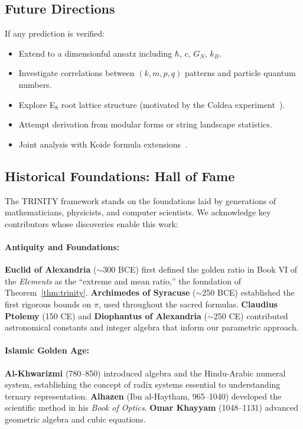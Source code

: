 \documentclass[aps,prd,preprint,superscriptaddress,showpacs,nofootinbib,longbibliography]{revtex4-2}
\begin{document}
\subsection{Future Directions}

If any prediction is verified:
\begin{itemize}[itemsep=2pt]
    \item Extend to a dimensionful ansatz including $\hbar$, $c$, $G_N$, $k_B$.
    \item Investigate correlations between $(k,m,p,q)$ patterns and particle quantum numbers.
    \item Explore E$_8$ root lattice structure (motivated by the Coldea experiment~\cite{coldea2010}).
    \item Attempt derivation from modular forms or string landscape statistics.
    \item Joint analysis with Koide formula extensions~\cite{ma2024,koide_topology2025}.
\end{itemize}

\subsection{Historical Foundations: Hall of Fame}
\label{sec:hall_of_fame}

The TRINITY framework stands on the foundations laid by generations of mathematicians, physicists, and computer scientists. We acknowledge key contributors whose discoveries enable this work:

\paragraph{Antiquity and Foundations:}
\textbf{Euclid of Alexandria} ($\sim$300 BCE) first defined the golden ratio in Book VI of the \textit{Elements} as the ``extreme and mean ratio,'' the foundation of Theorem~\ref{thm:trinity}. \textbf{Archimedes of Syracuse} ($\sim$250 BCE) established the first rigorous bounds on $\pi$, used throughout the sacred formulas. \textbf{Claudius Ptolemy} (150 CE) and \textbf{Diophantus of Alexandria} ($\sim$250 CE) contributed astronomical constants and integer algebra that inform our parametric approach.

\paragraph{Islamic Golden Age:}
\textbf{Al-Khwarizmi} (780--850) introduced algebra and the Hindu-Arabic numeral system, establishing the concept of radix systems essential to understanding ternary representation. \textbf{Alhazen} (Ibn al-Haytham, 965--1040) developed the scientific method in his \textit{Book of Optics}. \textbf{Omar Khayyam} (1048--1131) advanced geometric algebra and cubic equations.
\end{document}

